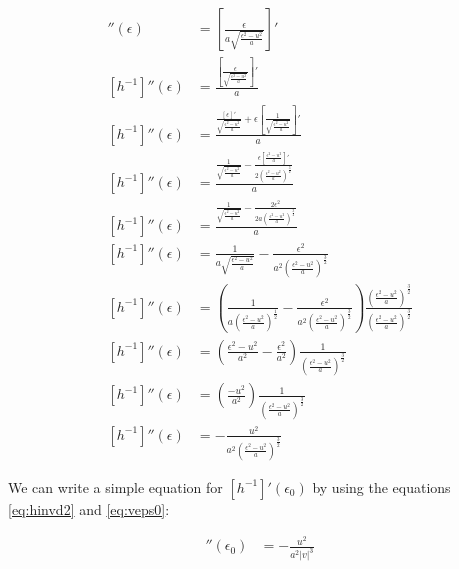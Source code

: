 \begin{align}
	[h^{-1}]''(\epsilon)  &= \left[ \frac{ \epsilon }{ a\sqrt{\frac{\epsilon^2 - u^2}{a}} } \right]'\nonumber\\
	[h^{-1}]''(\epsilon)  &= \frac {\left[ \frac{ \epsilon }{ \sqrt{\frac{\epsilon^2 - u^2}{a}} } \right]'}{ a }\nonumber\\
	[h^{-1}]''(\epsilon)  &= \frac { \frac{ \left[ \epsilon \right]' }{ \sqrt{\frac{\epsilon^2 - u^2}{a}} } + \epsilon \left[ \frac{1}{ \sqrt{\frac{\epsilon^2 - u^2}{a}} } \right]' }{ a }\nonumber\\
	[h^{-1}]''(\epsilon)  &= \frac { \frac{1}{ \sqrt{\frac{\epsilon^2 - u^2}{a}}}  - \frac{\epsilon \left[ \frac{\epsilon^2 - u^2}{a} \right]' }{ 2\left(\frac{\epsilon^2 - u^2}{a}\right)^{\frac{3}{2}} } }{a}\nonumber\\
	[h^{-1}]''(\epsilon)  &= \frac { \frac{1}{ \sqrt{\frac{\epsilon^2 - u^2}{a}}}  - \frac{2\epsilon^2 }{ 2a\left(\frac{\epsilon^2 - u^2}{a}\right)^{\frac{3}{2}} } }{a}\nonumber\\
	[h^{-1}]''(\epsilon)  &= \frac{1}{ a\sqrt{\frac{\epsilon^2 - u^2}{a}}}  - \frac{\epsilon^2 }{ a^2\left(\frac{\epsilon^2 - u^2}{a}\right)^{\frac{3}{2}} }\nonumber\\
	[h^{-1}]''(\epsilon)  &= \left( \frac{1}{ a\left(\frac{\epsilon^2 - u^2}{a}\right)^{\frac{1}{2}}} - \frac{\epsilon^2 }{ a^2\left(\frac{\epsilon^2 - u^2}{a}\right)^{\frac{3}{2}} } \right) \frac{\left(\frac{\epsilon^2 - u^2}{a}\right)^{\frac{3}{2}}}{\left(\frac{\epsilon^2 - u^2}{a}\right)^{\frac{3}{2}}}\nonumber\\
	[h^{-1}]''(\epsilon)  &= \left( \frac{ \epsilon^2 - u^2 }{a^2}  - \frac{\epsilon^2 }{a^2} \right) \frac{1}{\left(\frac{\epsilon^2 - u^2}{a}\right)^{\frac{3}{2}}}\nonumber\\
	[h^{-1}]''(\epsilon)  &= \left( \frac{-u^2}{a^2} \right) \frac{1}{\left(\frac{\epsilon^2 - u^2}{a}\right)^{\frac{3}{2}}}\nonumber\\
	[h^{-1}]''(\epsilon)  &= - \frac{u^2}{a^2\left(\frac{\epsilon^2 - u^2}{a}\right)^{\frac{3}{2}}}\label{eq:hinvd2}
\end{align}

We can write a simple equation for $[h^{-1}]'(\epsilon_0)$ by using the equations \ref{eq:hinvd2} and \ref{eq:veps0}:

\begin{align}
	[h^{-1}]''(\epsilon_0)  &= - \frac{u^2}{a^2 \left| v \right|^3}\label{eq:hinvd2eps0}
\end{align}

